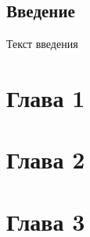 \documentclass[12pt,a4paper, oneside]{extreport}
\begin{document}


\tableofcontents


\section*{Введение}

Текст введения

\chapter{Глава 1} 


\chapter{Глава 2} 


\chapter{Глава 3} 

\end{document}
